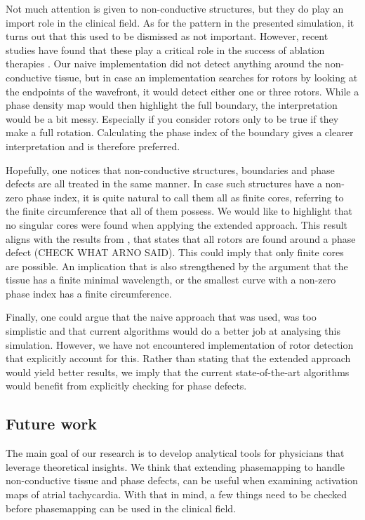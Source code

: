 \documentclass[twocolumn]{article}
\begin{document}
Not much attention is given to non-conductive structures, but they do
play an import role in the clinical field. As for the pattern in the
presented simulation, it turns out that this used to be dismissed as not
important. However, recent studies have found that these play a critical
role in the success of ablation therapies
\autocite{duytschaever2024atrial, santucci2024identification, takigawa2019a}.
Our naive implementation did not detect anything around the
non-conductive tissue, but in case an implementation searches for rotors
by looking at the endpoints of the wavefront, it would detect either one
or three rotors. While a phase density map would then highlight the full
boundary, the interpretation would be a bit messy. Especially if you
consider rotors only to be true if they make a full rotation.
Calculating the phase index of the boundary gives a clearer
interpretation and is therefore preferred.

Hopefully, one notices that non-conductive structures, boundaries and
phase defects are all treated in the same manner.
In case such structures have a non-zero phase index,
it is quite natural to call them all as finite cores,
referring to the finite circumference that all of them possess.
We would like to highlight that no singular cores were found when
applying the extended approach.
This result aligns with the results from \autocite{tomii2021spatial, arno2021a},
that states that all rotors are found around a phase defect (CHECK
WHAT ARNO SAID).
This could imply that only finite cores are possible.
An implication that is also strengthened by the argument that the
tissue has a finite minimal wavelength,
or the smallest curve with a non-zero phase index has a finite circumference.

Finally, one could argue that the naive approach that was used,
was too simplistic and that current algorithms would do a better job at
analysing this simulation.
However, we have not encountered implementation of rotor detection
that explicitly account for this.
Rather than stating that the extended approach would yield better results,
we imply that the current state-of-the-art algorithms would benefit
from explicitly checking for phase defects.

\subsection{Future work}\label{future-work}

The main goal of our research is to develop analytical tools for physicians
that leverage theoretical insights.
We think that extending phasemapping to handle non-conductive tissue
and phase defects,
can be useful when examining activation maps of atrial tachycardia.
With that in mind, a few things need to be checked before
phasemapping can be used in the clinical field.
\end{document}
